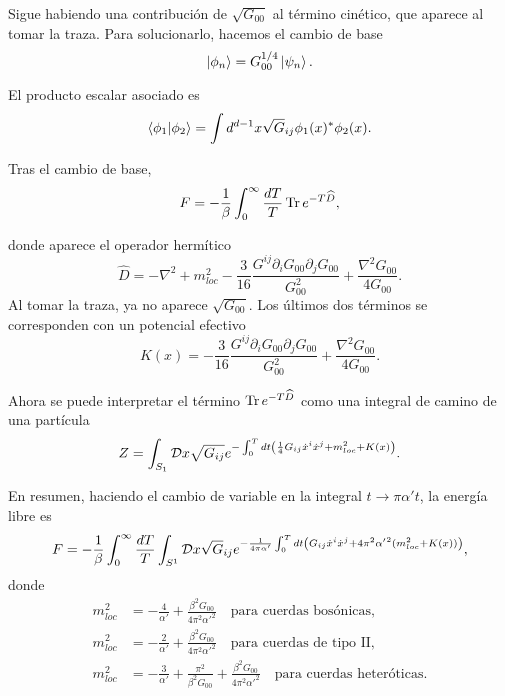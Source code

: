 Sigue habiendo una contribución de $\sqrt{G_{00}}$ al término cinético, que aparece al tomar la traza.
Para solucionarlo, hacemos el cambio de base
\begin{equation}
  \ket{\phi_n}=G_{00}^{1/4}  \ket{\psi_n}.
\end{equation}

El producto escalar asociado es
\begin{equation}
  \braket{\phi_1}{\phi_2} = \int d^{d-1} x \sqrt G_{ij} \phi_1(x)^* \phi_2(x).
\end{equation}

Tras el cambio de base,
\begin{equation}
  F=-\frac{1}{\beta}\int_0^\infty \frac{dT}{T} \Tr e^{-T\widehat D},
\end{equation}

donde aparece el operador hermítico
\begin{equation}
  \widehat D = -\nabla^2  + m_{loc}^2- \frac{3}{16}\frac{G^{ij} \partial_i G_{00}\partial_j G_{00}}{G_{00}^2}
  +\frac{\nabla^2 G_{00}}{4G_{00}}.
\end{equation}
Al tomar la traza, ya no aparece $\sqrt{G_{00}}$.
Los últimos dos términos se corresponden con un potencial efectivo
\begin{equation}
  K(x) = -\frac{3}{16}\frac{G^{ij} \partial_i G_{00}\partial_j G_{00}}{G_{00}^2}
  +\frac{\nabla^2 G_{00}}{4G_{00}}.
\end{equation}

Ahora se puede interpretar el término $\Tr e^{-T\widehat{D}}$ como una integral de camino
de una partícula 
\begin{equation}
Z=  \int_{S_1} \mathcal D x \sqrt{G_{ij}} e^{-\int_0^T dt \qty(\frac{1}{4}G_{ij}\dot x^i\dot x^j+m_{loc}^2+K(x))}.
\end{equation}

En resumen, haciendo el cambio de variable en la integral $t\to\pi \alpha't$, la energía libre es
\begin{equation}
  F=-\frac{1}{\beta}\int_0^\infty \frac{dT}{T} \int_{S^1} \mathcal D x\sqrt G_{ij}  e^{ -\frac{1}{4\pi\alpha'}\int_0^T dt \qty(  
  G_{ij}\dot x^i \dot x^j  + 4\pi^2{\alpha'}^2 (m_{loc}^2+K(x)))},
\end{equation}
donde
\begin{equation}
  \begin{aligned}
    m_{loc}^2 &= -\frac{4}{\alpha'}+\frac{\beta^2G_{00}}{4\pi^2 \alpha'^2} \quad\text{para cuerdas bosónicas},\\
    m_{loc}^2 &= -\frac{2}{\alpha'}+\frac{\beta^2G_{00}}{4\pi^2 \alpha'^2} \quad\text{para cuerdas de tipo II},\\
    m_{loc}^2 &= -\frac{3}{\alpha'}+\frac{\pi^2}{\beta^2 G_{00}}+\frac{\beta^2G_{00}}{4\pi^2 \alpha'^2}\quad\text{para cuerdas heteróticas}.
  \end{aligned}
\end{equation}

